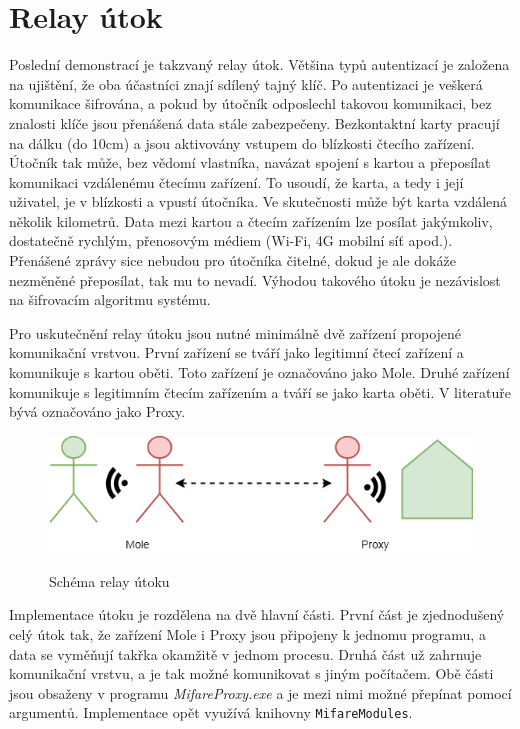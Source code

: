 \section{Relay útok}
\label{relayImplementace}
Poslední demonstrací je takzvaný relay útok. Většina typů autentizací je založena na ujištění, že oba účastníci znají sdílený tajný klíč. Po autentizaci je veškerá komunikace šifrována, a pokud by útočník odposlechl takovou komunikaci, bez znalosti klíče jsou přenášená data stále zabezpečeny. Bezkontaktní karty pracují na dálku (do 10cm) a jsou aktivovány vstupem do blízkosti čtecího zařízení. Útočník tak může, bez vědomí vlastníka, navázat spojení s kartou a přeposílat komunikaci vzdálenému čtecímu zařízení. To usoudí, že karta, a tedy i její uživatel, je v blízkosti a vpustí útočníka. Ve skutečnosti může být karta vzdálená několik kilometrů. Data mezi kartou a čtecím zařízením lze posílat jakýmkoliv, dostatečně rychlým, přenosovým médiem ({Wi-Fi}, 4G mobilní síť apod.). Přenášené zprávy sice nebudou pro útočníka čitelné, dokud je ale dokáže nezměněné přeposílat, tak mu to nevadí. Výhodou takového útoku je nezávislost na šifrovacím algoritmu systému.\par

Pro uskutečnění relay útoku jsou nutné minimálně dvě zařízení propojené komunikační vrstvou. První zařízení se tváří jako legitimní čtecí zařízení a komunikuje s kartou oběti. Toto zařízení je označováno jako Mole. Druhé zařízení komunikuje s legitimním čtecím zařízením a tváří se jako karta oběti. V literatuře bývá označováno jako Proxy.\cite{PracticalRelayAttack} 

\begin{figure}[ht]\centering
  \centering
  \includegraphics[width=\linewidth]{obrazky-figures/relayAttack.png}\\[1pt]  
  \caption{Schéma relay útoku}    
  \label{obrazekRelayAttack}
\end{figure}

Implementace útoku je rozdělena na dvě hlavní části. První část je zjednodušený celý útok tak, že  zařízení Mole i Proxy jsou připojeny k jednomu programu, a data se vyměňují takřka okamžitě v jednom procesu. Druhá část už zahrnuje komunikační vrstvu, a je tak možné komunikovat s jiným počítačem. Obě části jsou obsaženy v programu \emph{MifareProxy.exe} a je mezi nimi možné přepínat pomocí argumentů. Implementace opět využívá knihovny \verb|MifareModules|.
\par
